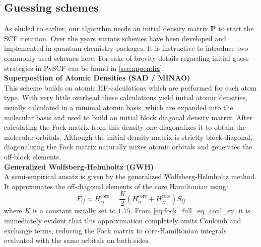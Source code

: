 \subsection{Guessing schemes}
\label{subsec:background_hf_guessing}
As eluded to earlier, our algorithm needs an initial density matrix $\mathbf{P}$ to start the SCF iteration. Over the years various schemes have been developed and implemented in quantum chemistry packages. It is instructive to introduce two commonly used schemes here. For sake of brevity details regarding initial guess strategies in PySCF can be found in \autoref{sec:appendix}.\\

\textbf{Superposition of Atomic Densities (SAD / MINAO)}\\
This scheme builds on atomic HF-calculations which are performed for each atom type. With very little overhead these calculations yield initial atomic densities, usually calculated in a minimal atomic basis, which are expanded into the molecular basis and used to build an initial block diagonal density matrix. After calculating the Fock matrix from this density one diagonalizes it to obtain the molecular orbitals. Although the initial density matrix is strictly block-diagonal, diagonalizing the Fock matrix naturally mixes atomic orbitals and generates the off-block elements. \parencite{ref:sad_guess}\\

\textbf{Generalized Wolfsberg-Helmholtz (GWH)}\\
A semi-empirical ansatz is given by the generalized Wolfsberg-Helmholtz method. It approximates the off-diagonal elements of the core Hamiltonian using: 
\begin{equation}
    \label{eq:gwh}
    F_{ij} \approx H^{\text{core}}_{ij} = \frac{K}{2}(H^{\text{core}}_{ii} + H^{\text{core}}_{jj})S_{ij}
\end{equation}
where $K$ is a constant usually set to $1.75$. From \autoref{eq:fock_full_eq_coul_ex} it is immediately evident that this approximation completely omits Coulomb and exchange terms, reducing the Fock matrix to core-Hamiltonian integrals evaluated with the same orbitals on both sides. \parencite{ref:gwh_wolfsberg1952spectra, ref:Lehtola2019}

